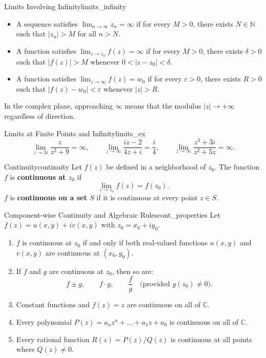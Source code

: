 \begin{definition}{Limits Involving Infinity}{limits_infinity}
\begin{itemize}
    \item A sequence satisfies $\lim_{n \to \infty} z_n = \infty$ if for every $M > 0$, there exists $N \in \mathbb{N}$ such that $|z_n| > M$ for all $n > N$.
    \item A function satisfies $\lim_{z \to z_0} f(z) = \infty$ if for every $M > 0$, there exists $\delta > 0$ such that $|f(z)| > M$ whenever $0 < |z - z_0| < \delta$.
    \item A function satisfies $\lim_{z \to \infty} f(z) = w_0$ if for every $\varepsilon > 0$, there exists $R > 0$ such that $|f(z) - w_0| < \varepsilon$ whenever $|z| > R$.
\end{itemize}
In the complex plane, approaching $\infty$ means that the modulus $|z| \to +\infty$ regardless of direction.
\end{definition}

\begin{example}{Limits at Finite Points and Infinity}{limits_ex}
\begin{equation}
\lim_{z \to 3i} \frac{z}{z^2 + 9} = \infty, \qquad \lim_{z \to \infty} \frac{iz - 2}{4z + i} = \frac{i}{4}, \qquad \lim_{z \to \infty} \frac{z^3 + 3i}{z^2 + 5z} = \infty.
\end{equation}
\end{example}

\begin{definition}{Continuity}{continuity}
Let $f(z)$ be defined in a neighborhood of $z_0$. The function $f$ is \textbf{continuous at $z_0$} if
\begin{equation}
\lim_{z \to z_0} f(z) = f(z_0).
\end{equation}
$f$ is \textbf{continuous on a set $S$} if it is continuous at every point $z \in S$.
\end{definition}

\begin{proposition}{Component-wise Continuity and Algebraic Rules}{cont_properties}
Let $f(z) = u(x, y) + i v(x, y)$ with $z_0 = x_0 + i y_0$.
\begin{enumerate}
    \item $f$ is continuous at $z_0$ if and only if both real-valued functions $u(x, y)$ and $v(x, y)$ are continuous at $(x_0, y_0)$.
    \item If $f$ and $g$ are continuous at $z_0$, then so are:
    \begin{equation}
    f \pm g, \qquad f \cdot g, \qquad \frac{f}{g} \quad \big(\text{provided } g(z_0) \neq 0\big).
    \end{equation}
    \item Constant functions and $f(z) = z$ are continuous on all of $\mathbb{C}$.
    \item Every polynomial $P(z) = a_n z^n + \dots + a_1 z + a_0$ is continuous on all of $\mathbb{C}$.
    \item Every rational function $R(z) = P(z)/Q(z)$ is continuous at all points where $Q(z) \neq 0$.
\end{enumerate}
\end{proposition}

